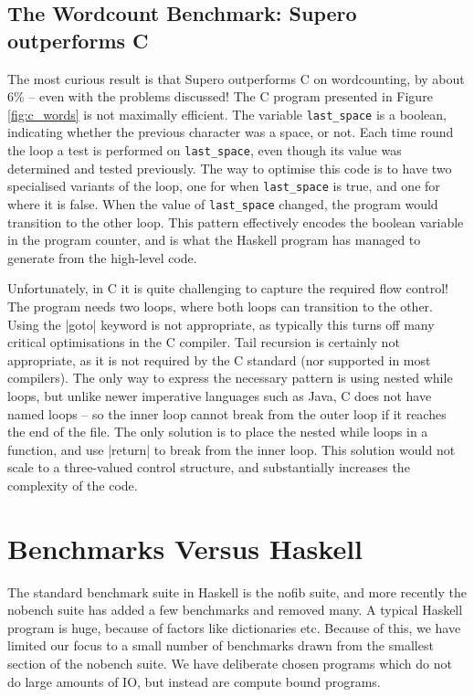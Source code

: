 \documentclass{llncs}
\begin{document}
\subsection{The Wordcount Benchmark: Supero outperforms C}

The most curious result is that Supero outperforms C on wordcounting, by about 6\% -- even with the problems discussed! The C program presented in Figure \ref{fig:c_words} is not maximally efficient. The variable \verb"last_space" is a boolean, indicating whether the previous character was a space, or not. Each time round the loop a test is performed on \verb"last_space", even though its value was determined and tested previously. The way to optimise this code is to have two specialised variants of the loop, one for when \verb"last_space" is true, and one for where it is false. When the value of \verb"last_space" changed, the program would transition to the other loop. This pattern effectively encodes the boolean variable in the program counter, and is what the Haskell program has managed to generate from the high-level code.

Unfortunately, in C it is quite challenging to capture the required flow control! The program needs two loops, where both loops can transition to the other. Using the |goto| keyword is not appropriate, as typically this turns off many critical optimisations in the C compiler. Tail recursion is certainly not appropriate, as it is not required by the C standard (nor supported in most compilers). The only way to express the necessary pattern is using nested while loops, but unlike newer imperative languages such as Java, C does not have named loops -- so the inner loop cannot break from the outer loop if it reaches the end of the file. The only solution is to place the nested while loops in a function, and use |return| to break from the inner loop. This solution would not scale to a three-valued control structure, and substantially increases the complexity of the code.

\section{Benchmarks Versus Haskell}

The standard benchmark suite in Haskell is the nofib suite, and more recently the nobench suite has added a few benchmarks and removed many. A typical Haskell program is huge, because of factors like dictionaries etc. Because of this, we have limited our focus to a small number of benchmarks drawn from the smallest section of the nobench suite. We have deliberate chosen programs which do not do large amounts of IO, but instead are compute bound programs.
\end{document}
